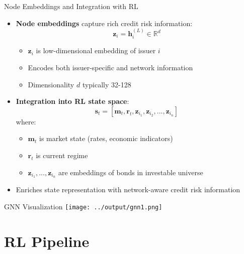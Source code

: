 \documentclass{beamer}
\begin{document}
\begin{frame}{Node Embeddings and Integration with RL}
\begin{itemize}
    \item \textbf{Node embeddings} capture rich credit risk information:
    \begin{equation}
    \mathbf{z}_i = \mathbf{h}_i^{(L)} \in \mathbb{R}^d
    \end{equation}
    \begin{itemize}
        \item $\mathbf{z}_i$ is low-dimensional embedding of issuer $i$
        \item Encodes both issuer-specific and network information
        \item Dimensionality $d$ typically 32-128
    \end{itemize}
    \item \textbf{Integration into RL state space}:
    \begin{equation}
    \mathbf{s}_t = [\mathbf{m}_t, \mathbf{r}_t, \mathbf{z}_{i_1}, \mathbf{z}_{i_2}, ..., \mathbf{z}_{i_n}]
    \end{equation}
    where:
    \begin{itemize}
        \item $\mathbf{m}_t$ is market state (rates, economic indicators)
        \item $\mathbf{r}_t$ is current regime
        \item $\mathbf{z}_{i_1}, ..., \mathbf{z}_{i_n}$ are embeddings of bonds in investable universe
    \end{itemize}
    \item Enriches state representation with network-aware credit risk information
\end{itemize}
\end{frame}

\begin{frame}{GNN Visualization}
    \centering
    \texttt{[image: ../output/gnn1.png]}
\end{frame}


\section{RL Pipeline}
\end{document}

